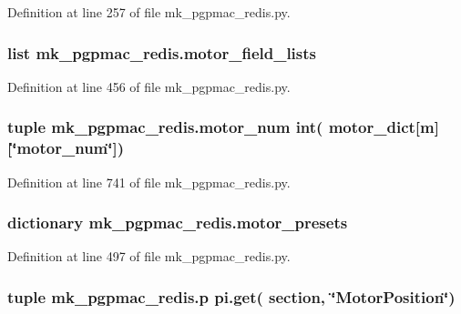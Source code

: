 Definition at line 257 of file mk\-\_\-pgpmac\-\_\-redis.\-py.

\hypertarget{namespacemk__pgpmac__redis_a7228dc1b6ecec376538db1efe8c05ffb}{
\subsubsection[{motor\-\_\-field\-\_\-lists}]{\setlength{\rightskip}{0pt plus 5cm}list mk\-\_\-pgpmac\-\_\-redis.\-motor\-\_\-field\-\_\-lists}}\label{namespacemk__pgpmac__redis_a7228dc1b6ecec376538db1efe8c05ffb}


Definition at line 456 of file mk\-\_\-pgpmac\-\_\-redis.\-py.

\hypertarget{namespacemk__pgpmac__redis_a292515b2acabb0dcade5b16584cdb011}{
\subsubsection[{motor\-\_\-num}]{\setlength{\rightskip}{0pt plus 5cm}tuple mk\-\_\-pgpmac\-\_\-redis.\-motor\-\_\-num int( {\bf motor\-\_\-dict}\mbox{[}m\mbox{]}\mbox{[}\char`\"{}motor\-\_\-num\char`\"{}\mbox{]})}}\label{namespacemk__pgpmac__redis_a292515b2acabb0dcade5b16584cdb011}


Definition at line 741 of file mk\-\_\-pgpmac\-\_\-redis.\-py.

\hypertarget{namespacemk__pgpmac__redis_a2a04d8d0b7270384d1fac674c29e774a}{
\subsubsection[{motor\-\_\-presets}]{\setlength{\rightskip}{0pt plus 5cm}dictionary mk\-\_\-pgpmac\-\_\-redis.\-motor\-\_\-presets}}\label{namespacemk__pgpmac__redis_a2a04d8d0b7270384d1fac674c29e774a}


Definition at line 497 of file mk\-\_\-pgpmac\-\_\-redis.\-py.

\hypertarget{namespacemk__pgpmac__redis_a11daf2847f2dc94562b5b61b3f412574}{
\subsubsection[{p}]{\setlength{\rightskip}{0pt plus 5cm}tuple mk\-\_\-pgpmac\-\_\-redis.\-p pi.\-get( section, \char`\"{}Motor\-Position\char`\"{})}}\label{namespacemk__pgpmac__redis_a11daf2847f2dc94562b5b61b3f412574}


